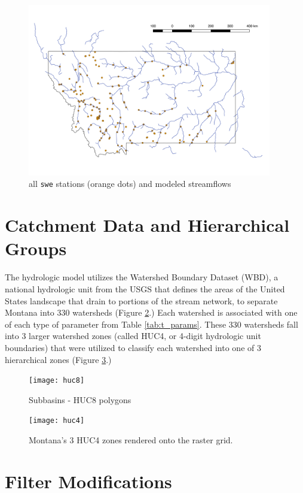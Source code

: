 \begin{figure}[h]
    \centering
    \includegraphics[width=0.95\textwidth]{stations}
    \caption{all \texttt{swe} stations (orange dots) and modeled streamflows}
    \label{fig:stations}
\end{figure}

\section{Catchment Data and Hierarchical Groups}

The hydrologic model utilizes the Watershed Boundary Dataset (WBD), a national hydrologic unit from the USGS that defines the areas of the United States landscape that drain to portions of the stream network, to separate Montana into 330 watersheds (Figure \ref{fig:huc8}.) Each watershed is associated with one of each type of parameter from Table \ref{tab:t_params}. These 330 watersheds fall into 3 larger watershed zones (called HUC4, or 4-digit hydrologic unit boundaries) that were utilized to classify each watershed into one of 3 hierarchical zones (Figure \ref{fig:huc4}.)

\begin{figure}[h]
    \centering
    \texttt{[image: huc8]}
    \caption{Subbasins - HUC8 polygons}
    \label{fig:huc8}
\end{figure}

\begin{figure}[h]
    \centering
    \texttt{[image: huc4]}
    \caption{Montana's 3 HUC4 zones rendered onto the raster grid.}
    \label{fig:huc4}
\end{figure}

\section{Filter Modifications}

